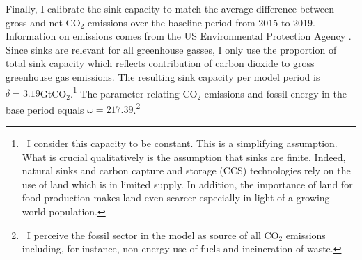 Finally, I calibrate the sink capacity to match the average difference between gross and net CO$_2$ emissions over the baseline period from 2015 to 2019. Information on emissions comes from the US Environmental Protection Agency \citep{EPAems}. Since sinks are relevant for all greenhouse gasses, I only use the proportion of total sink capacity which reflects contribution of carbon dioxide to gross greenhouse gas emissions. The resulting sink capacity per model period is $\delta=3.19$GtCO$_2$.\footnote{\ I consider this capacity to be constant. This is a simplifying assumption. What is crucial qualitatively is the assumption that sinks are finite. Indeed, natural sinks and carbon capture and storage (CCS) technologies rely on the use of land \citep{VanVuuren2018AlternativeTechnologies} which is in limited supply. In addition, the importance of land for food production makes land even scarcer especially in light of a growing world population.}
The parameter relating CO$_2$ emissions and fossil energy in the base period equals $\omega=217.39$.\footnote{\  I perceive the fossil sector in the model as source of all CO$_2$ emissions including, for instance, non-energy use of fuels and incineration of waste.}  


